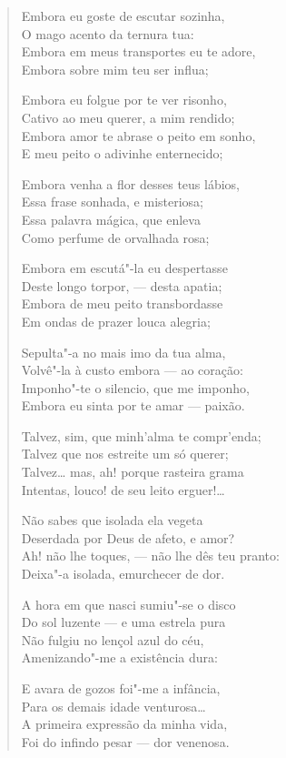 \begin{verse}
Embora eu goste de escutar sozinha,\\
O mago acento da ternura tua:\\
Embora em meus transportes eu te adore,\\
Embora sobre mim teu ser influa;

Embora eu folgue por te ver risonho,\\
Cativo ao meu querer, a mim rendido;\\
Embora amor te abrase o peito em sonho,\\
E meu peito o adivinhe enternecido;

Embora venha a flor desses teus lábios,\\
Essa frase sonhada, e misteriosa;\\
Essa palavra mágica, que enleva\\
Como perfume de orvalhada rosa;

Embora em escutá"-la eu despertasse\\
Deste longo torpor, --- desta apatia;\\
Embora de meu peito transbordasse\\
Em ondas de prazer louca alegria;

Sepulta"-a no mais imo da tua alma,\\
Volvê"-la à custo embora --- ao coração:\\
Imponho"-te o silencio, que me imponho,\\
Embora eu sinta por te amar --- paixão.

Talvez, sim, que minh'alma te compr'enda;\\
Talvez que nos estreite um só querer;\\
Talvez\ldots{} mas, ah! porque rasteira grama\\
Intentas, louco! de seu leito erguer!\ldots{}

Não sabes que isolada ela vegeta\\
Deserdada por Deus de afeto, e amor?\\
Ah! não lhe toques, --- não lhe dês teu pranto:\\
Deixa"-a isolada, emurchecer de dor.

A hora em que nasci sumiu"-se o disco\\
Do sol luzente --- e uma estrela pura\\
Não fulgiu no lençol azul do céu,\\
Amenizando"-me a existência dura:

E avara de gozos foi"-me a infância,\\
Para os demais idade venturosa\ldots{}\\
A primeira expressão da minha vida,\\
Foi do infindo pesar --- dor venenosa.


\end{verse}
